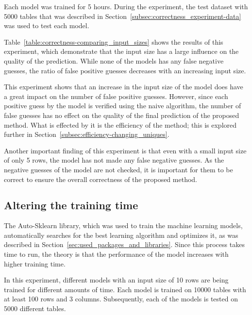 Each model was trained for \num{5} hours. During the experiment, the test dataset with \num{5000} tables that was described in Section~\ref{subsec:correctness_experiment-data} was used to test each model. %

Table~\ref{table:correctness-comparing_input_sizes} shows the results of this experiment, which demonstrate that the input size has a large influence on the quality of the prediction. While none of the models has any false negative guesses, the ratio of false positive guesses decreases with an increasing input size.

This experiment shows that an increase in the input size of the model does have a great impact on the number of false positive guesses. However, since each positive guess by the model is verified using the naive algorithm, the number of false guesses has no effect on the quality of the final prediction of the proposed method. What is effected by it is the efficiency of the method; this is explored further in Section~\ref{subsec:efficiency-changing_uniques}.

Another important finding of this experiment is that even with a small input size of only \num{5} rows, the model has not made any false negative guesses. As the negative guesses of the model are not checked, it is important for them to be correct to ensure the overall correctness of the proposed method.




\subsection{Altering the training time}\label{subsec:correctness_comparing-training-time} %
The Auto-Sklearn library, which was used to train the machine learning models, automatically searches for the best learning algorithm and optimizes it, as was described in Section~\ref{sec:used_packages_and_libraries}. Since this process takes time to run, the theory is that the performance of the model increases with higher training time. %

In this experiment, different models with an input size of \num{10} rows are being trained for different amounts of time. Each model is trained on \num{10000} tables with at least \num{100} rows and \num{3} columns. Subsequently, each of the models is tested on \num{5000} different tables.

